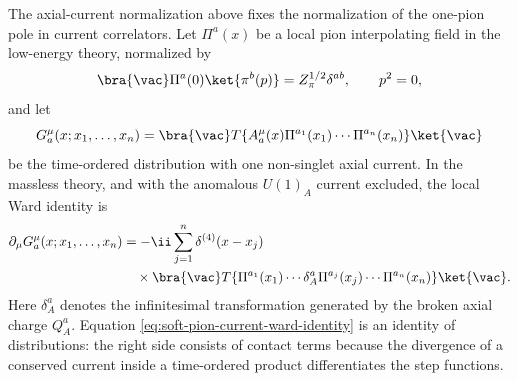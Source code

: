 The axial-current normalization above fixes the normalization of the one-pion
pole in current correlators.  Let \(\Pi^a(x)\) be a local pion interpolating
field in the low-energy theory, normalized by
\[
  \bra{\vac}\Pi^a(0)\ket{\pi^b(p)}
  =
  Z_\pi^{1/2}\delta^{ab},
  \qquad p^2=0,
\]
and let
\[
  G_a^\mu(x;x_1,\ldots,x_n)
  =
  \bra{\vac}
  T\{A_a^\mu(x)\Pi^{a_1}(x_1)\cdots\Pi^{a_n}(x_n)\}
  \ket{\vac}
\]
be the time-ordered distribution with one non-singlet axial current.  In the
massless theory, and with the anomalous \(U(1)_A\) current excluded, the local
Ward identity is
\begin{equation}
\begin{aligned}
  \partial_\mu G_a^\mu(x;x_1,\ldots,x_n)
  &=
  -\ii\sum_{j=1}^n
  \delta^{(4)}(x-x_j)
\\
  &\quad\times
  \bra{\vac}
  T\{\Pi^{a_1}(x_1)\cdots
  \delta_A^a\Pi^{a_j}(x_j)\cdots\Pi^{a_n}(x_n)\}
  \ket{\vac}.
\end{aligned}
\label{eq:soft-pion-current-ward-identity}
\end{equation}
Here \(\delta_A^a\) denotes the infinitesimal transformation generated by the
broken axial charge \(Q_A^a\).  Equation
\eqref{eq:soft-pion-current-ward-identity} is an identity of distributions:
the right side consists of contact terms because the divergence of a conserved
current inside a time-ordered product differentiates the step functions.

